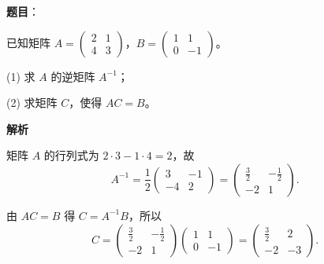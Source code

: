 \begin{answer}

\textbf{题目}：

已知矩阵 $A=\begin{pmatrix}2&1\\4&3\end{pmatrix}$，$B=\begin{pmatrix}1&1\\0&-1\end{pmatrix}$。

(1) 求 $A$ 的逆矩阵 $A^{-1}$；

(2) 求矩阵 $C$，使得 $AC=B$。

\textbf{解析}


矩阵 $A$ 的行列式为 $2\cdot3-1\cdot4=2$，故
\nopagebreak[4]
\[
A^{-1}=\frac12
\begin{pmatrix}3&-1\\-4&2\end{pmatrix}
=\begin{pmatrix}\frac32&-\frac12\\-2&1\end{pmatrix}.
\]


由 $AC=B$ 得 $C=A^{-1}B$，所以
\nopagebreak[4]
\[
C=
\begin{pmatrix}\frac32&-\frac12\\-2&1\end{pmatrix}
\begin{pmatrix}1&1\\0&-1\end{pmatrix}
=\begin{pmatrix}\frac32&2\\-2&-3\end{pmatrix}.
\]



\end{answer}
